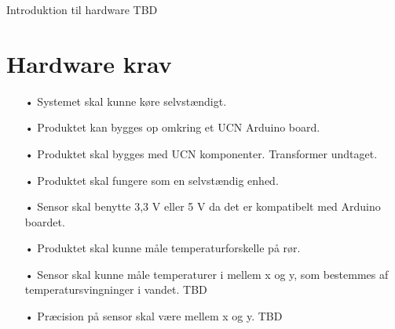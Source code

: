 Introduktion til hardware TBD
\section{Hardware krav}
\begin{enumerate}
	\item[•]Systemet skal kunne køre selvstændigt.
	\item[•]Produktet kan bygges op omkring et UCN Arduino board. 
	\item[•]Produktet skal bygges med UCN komponenter. Transformer undtaget.
	\item[•]Produktet skal fungere som en selvstændig enhed.
	\item[•]Sensor skal benytte 3,3 V eller 5 V da det er kompatibelt med Arduino boardet.
	\item[•]Produktet skal kunne måle temperaturforskelle på rør.
	\item[•]Sensor skal kunne måle temperaturer i mellem x og y, som bestemmes af temperatursvingninger i vandet. TBD
	\item[•]Præcision på sensor skal være mellem x og y. TBD
\end{enumerate}	
